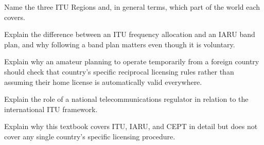 \begin{practiceproblems}
\item Name the three ITU Regions and, in general terms, which part of
the world each covers.
\item Explain the difference between an ITU frequency allocation and an
IARU band plan, and why following a band plan matters even though it is
voluntary.
\item Explain why an amateur planning to operate temporarily from a
foreign country should check that country's specific reciprocal
licensing rules rather than assuming their home license is
automatically valid everywhere.
\item Explain the role of a national telecommunications regulator in
relation to the international ITU framework.
\item Explain why this textbook covers ITU, IARU, and CEPT in detail
but does not cover any single country's specific licensing procedure.
\end{practiceproblems}
